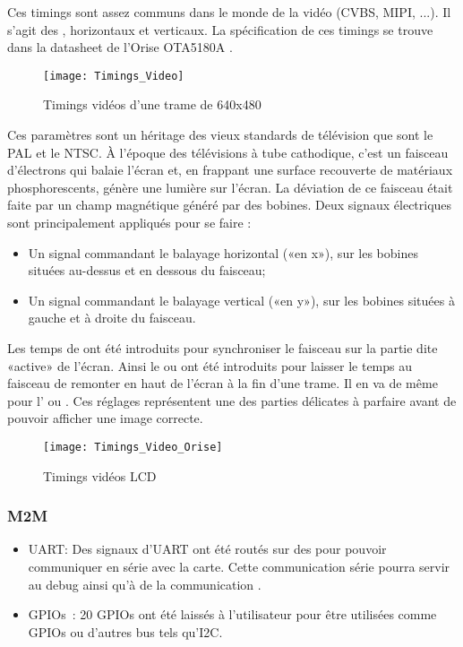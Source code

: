 Ces timings sont assez communs dans le monde de la vidéo (CVBS, MIPI, ...).
Il s’agit des ,  horizontaux et verticaux.
La spécification de ces timings se trouve dans la datasheet de l'Orise OTA5180A \autocite{orise:OTA5180A}.
            
\begin{figure}[H]
	\begin{center}
		\texttt{[image: Timings\_Video]}
	\end{center}
	\caption{Timings vidéos d’une trame de 640x480}
\end{figure}
            
Ces paramètres sont un héritage des vieux standards de télévision que sont le PAL et le NTSC.
À l’époque des télévisions à tube cathodique, c’est un faisceau d’électrons qui balaie l’écran et, en frappant une surface recouverte de matériaux phosphorescents, génère une lumière sur l’écran. 
La déviation de ce faisceau était faite par un champ magnétique généré par des bobines. 
Deux signaux électriques sont principalement appliqués pour se faire :
\begin{itemize}
	\item Un signal commandant le balayage horizontal («en x»), sur les bobines situées au-dessus et en dessous du faisceau;
	\item Un signal commandant le balayage vertical («en y»), sur les bobines situées à gauche et à droite du faisceau.
\end{itemize}
Les temps de  ont été introduits pour synchroniser le faisceau sur la partie dite «active» de l’écran. 
Ainsi le  ou  ont été introduits pour laisser le temps au faisceau de remonter en haut de l’écran à la fin d’une trame. 
Il en va de même pour l' ou .
Ces réglages représentent une des parties délicates à parfaire avant de pouvoir afficher
une image correcte.

\begin{figure}[H]
	\begin{center}
		\texttt{[image: Timings\_Video\_Orise]}
	\end{center}
	\caption{Timings vidéos LCD}
\end{figure}

\subsubsection{M2M}       
\begin{itemize}
	\item UART:
	      Des signaux d'UART ont été routés sur des  pour pouvoir communiquer en série avec la carte.
	      Cette communication série pourra servir au debug ainsi qu'à de la communication .
	\item \glspl{GPIO}~:
	      20 \glspl{GPIO} ont été laissés à l'utilisateur pour être utilisées comme \glspl{GPIO} ou d'autres bus tels qu'I2C. 
\end{itemize}          	


